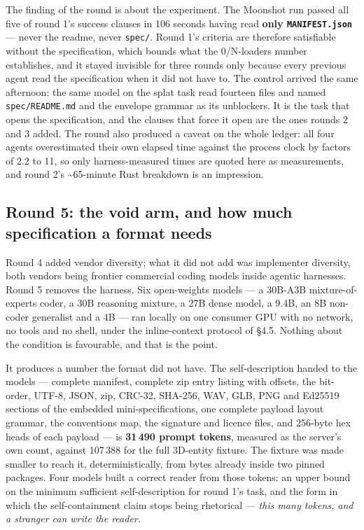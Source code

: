 \documentclass[10pt,twocolumn,letterpaper]{article}
\newcommand{\code}[1]{\texttt{\small #1}}
\begin{document}
The finding of the round is about the experiment. The Moonshot run passed all five of round 1's success clauses in 106 seconds having read \textbf{only \code{MANIFEST.json}} --- never the readme, never \code{spec/}. Round 1's criteria are therefore satisfiable without the specification, which bounds what the 0/N-loaders number establishes, and it stayed invisible for three rounds only because every previous agent read the specification when it did not have to. The control arrived the same afternoon: the same model on the splat task read fourteen files and named \code{spec/README.md} and the envelope grammar as its unblockers. It is the task that opens the specification, and the clauses that force it open are the ones rounds 2 and 3 added. The round also produced a caveat on the whole ledger: all four agents overestimated their own elapsed time against the process clock by factors of 2.2 to 11, so only harness-measured times are quoted here as measurements, and round 2's \textasciitilde{}65-minute Rust breakdown is an impression.

\subsection{Round 5: the void arm, and how much specification a format needs}

Round 4 added vendor diversity; what it did not add was implementer diversity, both vendors being frontier commercial coding models inside agentic harnesses. Round 5 removes the harness. Six open-weights models --- a 30B-A3B mixture-of-experts coder, a 30B reasoning mixture, a 27B dense model, a 9.4B, an 8B non-coder generalist and a 4B --- ran locally on one consumer GPU with no network, no tools and no shell, under the inline-context protocol of \S4.5. Nothing about the condition is favourable, and that is the point.

It produces a number the format did not have. The self-description handed to the models --- complete manifest, complete zip entry listing with offsets, the bit-order, UTF-8, JSON, zip, CRC-32, SHA-256, WAV, GLB, PNG and Ed25519 sections of the embedded mini-specifications, one complete payload layout grammar, the conventions map, the signature and licence files, and 256-byte hex heads of each payload --- is \textbf{31\,490 prompt tokens}, measured as the server's own count, against 107\,388 for the full 3D-entity fixture. The fixture was made smaller to reach it, deterministically, from bytes already inside two pinned packages. Four models built a correct reader from those tokens: an upper bound on the minimum sufficient self-description for round 1's task, and the form in which the self-containment claim stops being rhetorical --- \emph{this many tokens, and a stranger can write the reader.}
\end{document}
